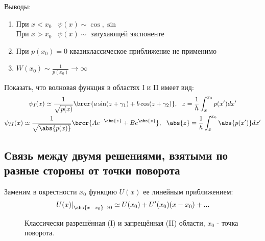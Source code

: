 Выводы:
\renewcommand{\labelenumi}{\arabic{enumi})}
\begin{enumerate}
\item При $x<x_0$~ $\psi(x) \sim \cos, \sin$\\
При $x>x_0$~ $\psi(x) \sim$ затухающей экспоненте
\item При $p(x_0) = 0$ квазиклассическое приближение не применимо
\item $W(x_0) \sim \frac{1}{p(x_0)} \to \infty$
\end{enumerate}

\begin{excr}
Показать, что волновая функция в областях I и II имеет вид:
$$
\begin{gathered}
\psi_I(x) \simeq \frac{1}{\sqrt{p(x)}} \brcr{a \sin(z+\gamma_1) + b \cos(z+\gamma_2)},~~ z = \frac{1}{h}\int_x^{x_0} p(x')dx'\\
\psi_{II}(x) \simeq \frac{1}{\sqrt{\abs{p(x)}}} \brcr{A e^{-\abs{z}} + B e^{\abs{z}}},~~ \abs{z} = \frac{1}{h}\int_x^{x_0} \abs{p(x')}dx'
\end{gathered}
$$
\end{excr}

\subsection{Связь между двумя решениями, взятыми по разные стороны от точки поворота}
Заменим в окрестности $x_0$ функцию $U(x)$ ее линейным приближением:
$$
\left. U(x) \right|_{\abs{x-x_0} \to 0} \simeq U(x_0) + U'(x_0)(x-x_0)+...
$$

\begin{figure}[h!]
\centering
{}
\caption{Классически разрешённая (I) и запрещённая (II) области, $x_0$ - точка поворота.} \label{fig:2}
\end{figure}



